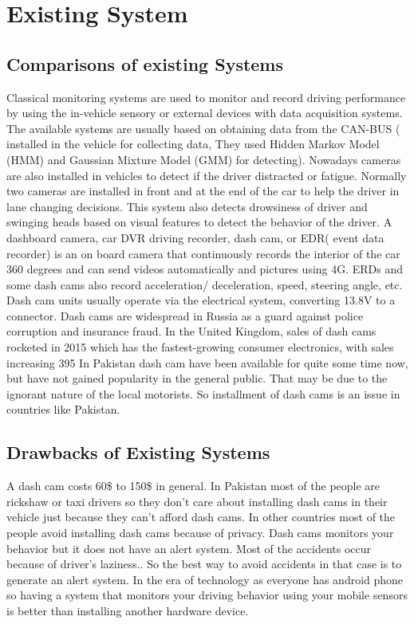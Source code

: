 \chapter{Existing System}
\section{Comparisons of existing Systems}
Classical monitoring systems are used to monitor and record driving performance by using the
in-vehicle sensory or external devices with data acquisition systems. The available systems are
usually based on obtaining data from the CAN-BUS ( installed in the vehicle for collecting data,
They used Hidden Markov Model (HMM) and Gaussian Mixture Model (GMM) for detecting).
Nowadays cameras are also installed in vehicles to detect if the driver distracted or fatigue.
Normally two cameras are installed in front and at the end of the car to help the driver in lane
changing decisions. This system also detects drowsiness of driver and swinging heads based
on visual features to detect the behavior of the driver.
A dashboard camera, car DVR driving recorder, dash cam, or EDR( event data recorder) is an
on board camera that continuously records the interior of the car 360 degrees and can send
videos automatically and pictures using 4G.
ERDs and some dash cams also record acceleration/ deceleration, speed, steering angle, etc.
Dash cam units usually operate via the electrical system, converting 13.8V to a %
connector.
Dash cams are widespread in Russia as a guard against police corruption and insurance fraud.
In the United Kingdom, sales of dash cams rocketed in 2015 which has the fastest-growing
consumer electronics, with sales increasing 395%
In Pakistan dash cam have been available for quite some time now, but have not gained
popularity in the general public. That may be due to the ignorant nature of the local motorists.
So installment of dash cams is an issue in countries like Pakistan.

\section{Drawbacks of Existing Systems}
A dash cam costs 60\$ to 150\$ in general. In Pakistan most of the people are
rickshaw or taxi drivers so they don't care about installing dash cams in their vehicle just
because they can’t afford dash cams. In other countries most of the people avoid installing dash
cams because of privacy. Dash cams monitors your behavior but it does not have an alert
system. Most of the accidents occur because of driver’s laziness.. So the best way to avoid
accidents in that case is to generate an alert system.
In the era of technology as everyone has android phone so having a system that monitors your
driving behavior using your mobile sensors is better than installing another hardware device.
